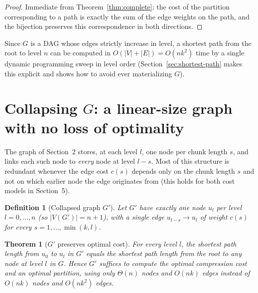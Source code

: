 \documentclass[11pt]{article}
\newtheorem{theorem}{Theorem}
\newtheorem{definition}{Definition}
\begin{document}
\begin{proof}
Immediate from Theorem~\ref{thm:complete}: the cost of the partition corresponding to a
path is exactly the sum of the edge weights on the path, and the bijection preserves
this correspondence in both directions.
\end{proof}

Since $G$ is a DAG whose edges strictly increase in level, a shortest path from the
root to level $n$ can be computed in $O(|V| + |E|) = O(nk^2)$ time by a single dynamic
programming sweep in level order (Section~\ref{sec:shortest-path} makes this explicit
and shows how to avoid ever materializing $G$).

\section{Collapsing $G$: a linear-size graph with no loss of optimality}
\label{sec:collapse}

The graph of Section~2 stores, at each level $l$, one node per chunk length $s$, and
links each such node to \emph{every} node at level $l-s$. Most of this structure is
redundant whenever the edge cost $c(s)$ depends only on the chunk length $s$ and not on
which earlier node the edge originates from (this holds for both cost models in
Section~5).

\begin{definition}[Collapsed graph $G'$]
Let $G'$ have exactly one node $u_l$ per level $l = 0, \dots, n$ (so $|V(G')| = n+1$),
with a single edge $u_{l-s} \to u_l$ of weight $c(s)$ for every $s = 1, \dots,
\min(k, l)$.
\end{definition}

\begin{theorem}[$G'$ preserves optimal cost]
\label{thm:collapse}
For every level $l$, the shortest path length from $u_0$ to $u_l$ in $G'$ equals the
shortest path length from the root to \emph{any} node at level $l$ in $G$. Hence $G'$
suffices to compute the optimal compression cost and an optimal partition, using only
$\Theta(n)$ nodes and $O(nk)$ edges instead of $O(nk)$ nodes and $O(nk^2)$ edges.
\end{theorem}
\end{document}

